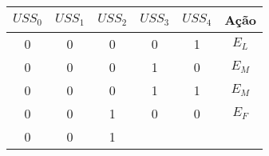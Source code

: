 \begin{table}[!htb]
\centering
\caption{}
\label{IA}
\begin{tabular}{|ccccc|c|}
\hline
{\color[HTML]{00009B} \textbf{$USS_0$}} & {\color[HTML]{00009B} \textbf{$USS_1$}} & {\color[HTML]{00009B} \textbf{$USS_2$}} & 
{\color[HTML]{00009B} \textbf{$USS_3$}} & {\color[HTML]{00009B} \textbf{$USS_4$}} & {\color[HTML]{FE0000} \textbf{Ação}} \\ 
\hline
{\color[HTML]{00009B} 0}                                     & {\color[HTML]{00009B} 0}                                    & {\color[HTML]{00009B} 0} 
 
                                  & {\color[HTML]{00009B} 0}                                    & {\color[HTML]{00009B} 1}                            
 
       & {\color[HTML]{FE0000} $E_L$}                                     \\ \hline
{\color[HTML]{00009B} 0}                                     & {\color[HTML]{00009B} 0}                                    & {\color[HTML]{00009B} 0} 
 
                                  & {\color[HTML]{00009B} 1}                                    & {\color[HTML]{00009B} 0}                            
 
       & {\color[HTML]{FE0000} $E_M$}                                     \\ \hline
{\color[HTML]{00009B} 0}                                     & {\color[HTML]{00009B} 0}                                    & {\color[HTML]{00009B} 0} 
 
                                  & {\color[HTML]{00009B} 1}                                    & {\color[HTML]{00009B} 1}                            
 
       & {\color[HTML]{FE0000} $E_M$}                                     \\ \hline
{\color[HTML]{00009B} 0}                                     & {\color[HTML]{00009B} 0}                                    & {\color[HTML]{00009B} 1} 
 
                                  & {\color[HTML]{00009B} 0}                                    & {\color[HTML]{00009B} 0}                            
 
       & {\color[HTML]{FE0000} $E_F$}                                     \\ \hline
{\color[HTML]{00009B} 0}                                     & {\color[HTML]{00009B} 0}                                    & {\color[HTML]{00009B} 1} 
 

\end{tabular}
\end{table}
